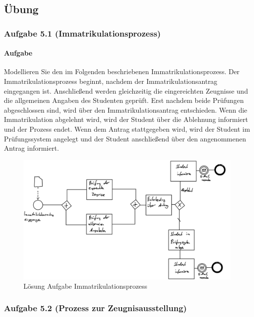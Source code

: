 \subsection{Übung}

\subsubsection*{Aufgabe 5.1 (Immatrikulationsprozess)}
    \paragraph*{Aufgabe}
        Modellieren Sie den im Folgenden beschriebenen Immatrikulationsprozess.
        Der Immatrikulationsprozess beginnt, nachdem der Immatrikulationsantrag eingegangen ist. Anschließend werden gleichzeitig die eingereichten Zeugnisse und die allgemeinen Angaben des Studenten geprüft. Erst nachdem beide Prüfungen abgeschlossen sind, wird über den Immatrikulationsantrag entschieden. Wenn die Immatrikulation abgelehnt wird, wird der Student über die Ablehnung informiert und der Prozess endet. Wenn dem Antrag stattgegeben wird, wird der Student im Prüfungssystem angelegt und der Student anschließend über den angenommenen Antrag informiert.
        \begin{figure}[h]
            \centering
            \includegraphics[width=\textwidth]{image/Loesung_Aufgabe_Immatrikulationsprozess.png}
            \caption{Lösung Aufgabe Immatrikulationsprozess}
            \label{fig:Loesung_Aufgabe_Immatrikulationsprozess}
        \end{figure}

\subsubsection*{Aufgabe 5.2 (Prozess zur Zeugnisausstellung)}
